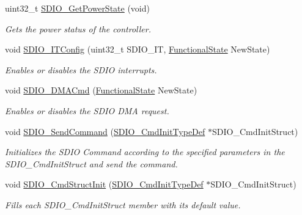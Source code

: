 \begin{DoxyCompactItemize}
uint32\+\_\+t \hyperlink{group___s_d_i_o___private___functions_ga3a19de2c7cd51645702213f64a1758ed}{S\+D\+I\+O\+\_\+\+Get\+Power\+State} (void)
\begin{DoxyCompactList}\small\item\em Gets the power status of the controller. \end{DoxyCompactList}\item 
void \hyperlink{group___s_d_i_o___private___functions_ga208f51237ef43288735829dbaed37f00}{S\+D\+I\+O\+\_\+\+I\+T\+Config} (uint32\+\_\+t S\+D\+I\+O\+\_\+\+IT, \hyperlink{group___exported__types_gac9a7e9a35d2513ec15c3b537aaa4fba1}{Functional\+State} New\+State)
\begin{DoxyCompactList}\small\item\em Enables or disables the S\+D\+IO interrupts. \end{DoxyCompactList}\item 
void \hyperlink{group___s_d_i_o___private___functions_gad36fde5ec0ce0c2089b9d971c2271e6e}{S\+D\+I\+O\+\_\+\+D\+M\+A\+Cmd} (\hyperlink{group___exported__types_gac9a7e9a35d2513ec15c3b537aaa4fba1}{Functional\+State} New\+State)
\begin{DoxyCompactList}\small\item\em Enables or disables the S\+D\+IO D\+MA request. \end{DoxyCompactList}\item 
void \hyperlink{group___s_d_i_o___private___functions_ga7117d2f702703f6c0a66bc07707cab23}{S\+D\+I\+O\+\_\+\+Send\+Command} (\hyperlink{struct_s_d_i_o___cmd_init_type_def}{S\+D\+I\+O\+\_\+\+Cmd\+Init\+Type\+Def} $\ast$S\+D\+I\+O\+\_\+\+Cmd\+Init\+Struct)
\begin{DoxyCompactList}\small\item\em Initializes the S\+D\+IO Command according to the specified parameters in the S\+D\+I\+O\+\_\+\+Cmd\+Init\+Struct and send the command. \end{DoxyCompactList}\item 
void \hyperlink{group___s_d_i_o___private___functions_ga09d9e89f49c87c82aec79c97b7068e24}{S\+D\+I\+O\+\_\+\+Cmd\+Struct\+Init} (\hyperlink{struct_s_d_i_o___cmd_init_type_def}{S\+D\+I\+O\+\_\+\+Cmd\+Init\+Type\+Def} $\ast$S\+D\+I\+O\+\_\+\+Cmd\+Init\+Struct)
\begin{DoxyCompactList}\small\item\em Fills each S\+D\+I\+O\+\_\+\+Cmd\+Init\+Struct member with its default value. \end{DoxyCompactList}\item 

\end{DoxyCompactItemize}
